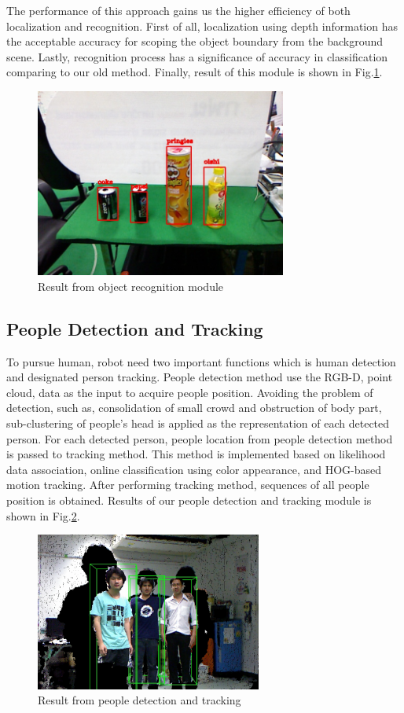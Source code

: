 \documentclass{llncs}
\begin{document}
The performance of this approach gains us the higher efficiency of both localization and recognition. First of all, localization using depth information has the acceptable accuracy for scoping the object boundary from the background scene. Lastly, recognition process has a significance of accuracy in classification comparing to our old method. Finally, result of this module is shown in Fig.\ref{fig:object_recog}.

\begin{figure}
\centering
\includegraphics[height=6.2cm]{object_recognition_figure}
\caption{Result from object recognition module}
\label{fig:object_recog}
\end{figure}

\subsection{People Detection and Tracking}

To pursue human, robot need two important functions which is human detection and designated person tracking. People detection method use the RGB-D, point cloud, data as the input to acquire people position. Avoiding the problem of detection, such as, consolidation of small crowd and obstruction of body part, sub-clustering of people's head is applied as the representation of each detected person. For each detected person, people location from people detection method is passed to tracking method. This method is implemented based on likelihood data association, online classification using color appearance, and HOG-based motion tracking\cite{pp_detect}. After performing tracking method, sequences of all people position is obtained. Results of our people detection and tracking module is shown in Fig.\ref{fig:people_detection}.

\begin{figure}
\centering
\includegraphics[height=5.2cm]{people_detection_figure}
\caption{Result from people detection and tracking}
\label{fig:people_detection}
\end{figure}
\end{document}

